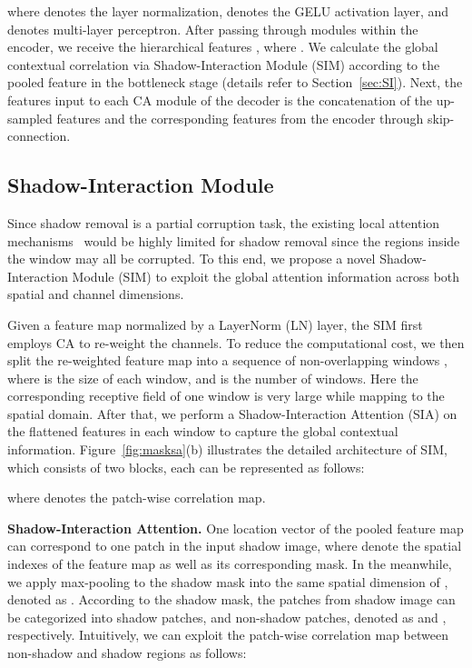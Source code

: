 \documentclass[letterpaper]{article} \usepackage{aaai23}  \usepackage{times}  \usepackage{helvet}  \usepackage{courier}  \usepackage[hyphens]{url}  \usepackage{graphicx} \urlstyle{rm} \def\UrlFont{\rm}  \usepackage{natbib}  \usepackage{caption} \frenchspacing  \setlength{\pdfpagewidth}{8.5in} \setlength{\pdfpageheight}{11in} \usepackage{algorithm}
\begin{document}
where  denotes the layer normalization,  denotes the GELU activation layer, and  denotes multi-layer perceptron. 
After passing through  modules within the encoder, we receive the hierarchical features , where . 
We calculate the global contextual correlation via Shadow-Interaction Module (SIM) according to the pooled feature  in the bottleneck stage (details refer to Section~\ref{sec:SI}).
Next, the features input to each CA module of the decoder is the concatenation of the up-sampled features and the corresponding features from the encoder through skip-connection.

\subsection{Shadow-Interaction Module\label{sec:SI}}
Since shadow removal is a partial corruption task, the existing local attention mechanisms~\cite{liu2021swin,wang2021uformer} would be highly limited for shadow removal since the regions inside the window may all be corrupted.
To this end, we propose a novel Shadow-Interaction Module (SIM) to exploit the global attention information across both spatial and channel dimensions.





Given a feature map  normalized by a LayerNorm (LN) layer, the SIM first employs CA to re-weight the channels.
To reduce the computational cost, we then split the re-weighted feature map into a sequence of non-overlapping windows , where  is the size of each window, and  is the number of windows. Here the corresponding receptive field of one window  is very large while mapping to the spatial domain.
After that, we perform a Shadow-Interaction Attention (SIA) on the flattened features in each window to capture the global contextual information. Figure~\ref{fig:masksa}(b) illustrates the detailed architecture of SIM, which consists of two blocks, each can be represented as follows:

where  denotes the patch-wise correlation map.






\vspace{1mm}
\noindent\textbf{Shadow-Interaction Attention.}
One location vector  of the pooled feature map  can correspond to one patch in the input shadow image, where  denote the spatial indexes of the feature map as well as its corresponding mask.
In the meanwhile, we apply max-pooling to the shadow mask  into the same spatial dimension of , denoted as .
According to the shadow mask, the patches from shadow image can be categorized into shadow patches, and non-shadow patches, denoted as  and , respectively. 
Intuitively, we can exploit the patch-wise correlation map  between non-shadow and shadow regions as follows:
\end{document}
